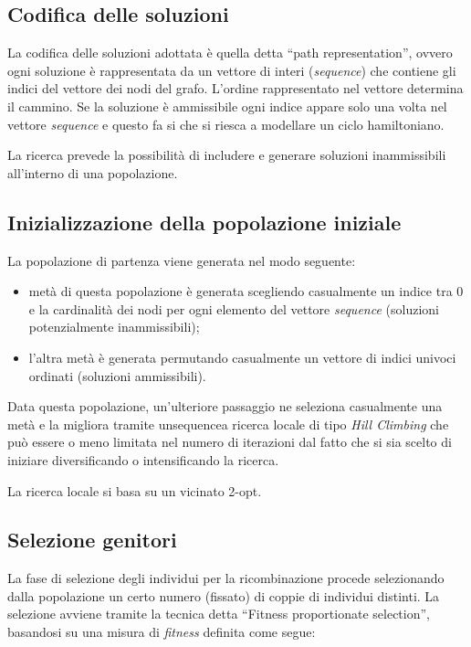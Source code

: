 \documentclass[a4paper]{article}
\begin{document}
        \subsection{Codifica delle soluzioni}
            La codifica delle soluzioni adottata \`e quella detta ``path representation'', ovvero
            ogni soluzione \`e rappresentata da un vettore di interi (\emph{sequence}) che contiene
            gli indici del vettore dei nodi del grafo. L'ordine rappresentato nel vettore determina il cammino.
            Se la soluzione \`e ammissibile ogni indice appare solo una volta nel vettore \emph{sequence} e questo fa si che si riesca a modellare
            un ciclo hamiltoniano.

            La ricerca prevede la possibilit\`a di includere e generare soluzioni inammissibili all'interno di una popolazione.

        \subsection{Inizializzazione della popolazione iniziale}
            La popolazione di partenza viene generata nel modo seguente:
            \begin{itemize}
                \item met\`a di questa popolazione \`e generata scegliendo casualmente un indice tra 0 e la cardinalit\`a dei nodi per ogni elemento del vettore \emph{sequence} (soluzioni potenzialmente inammissibili);
                \item l'altra met\`a \`e generata permutando casualmente un vettore di indici univoci ordinati (soluzioni ammissibili).
            \end{itemize}
            Data questa popolazione, un'ulteriore passaggio ne seleziona casualmente una met\`a e la migliora tramite unsequencea
            ricerca locale di tipo \emph{Hill Climbing} che pu\`o essere o meno limitata nel numero di iterazioni
            dal fatto che si sia scelto di iniziare diversificando o intensificando la ricerca.

            La ricerca locale si basa su un vicinato 2-opt.

        \subsection{Selezione genitori}
            La fase di selezione degli individui per la ricombinazione procede selezionando dalla popolazione un certo numero
            (fissato) di coppie di individui distinti.
            La selezione avviene tramite la tecnica detta ``Fitness proportionate selection'', basandosi su una misura di \emph{fitness}
            definita come segue:
\end{document}
